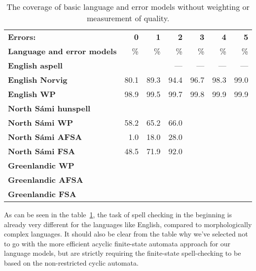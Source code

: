 \documentclass[a4paper,12pt]{article}
\begin{document}
\begin{table}
    \centering
    \begin{tabular}{|l|r|r|r||r|r|r|}
        \hline
        \bf Errors: & \bf 0  & \bf 1 & \bf 2 & \bf 3 & \bf 4 & \bf 5 \\
        \bf Language and error models &  \% & \% & \% & \% & \% & \% \\
        \hline
        \bf English aspell &      &      & ---  & ---  & ---  & ---  \\
        \bf English Norvig & 80.1 & 89.3 & 94.4 & 96.7 & 98.3 & 99.0 \\
            \bf English WP & 98.9 & 99.5 & 99.7 & 99.8 & 99.9 & 99.9 \\
        \hline
        \bf North Sámi hunspell & & & & & & \\
        \bf North Sámi WP & 58.2 & 65.2 & 66.0 & & & \\
               \bf North Sámi AFSA & 1.0 & 18.0 & 28.0 & & & \\
               \bf North Sámi FSA & 48.5 & 71.9 & 92.0 & & & \\
        \hline
        \bf Greenlandic WP & & & & & & \\
                 \bf Greenlandic AFSA & & & & & & \\
                  \bf Greenlandic FSA & & & & & & \\
        \hline
    \end{tabular}
    \caption{The coverage of basic language and error models without weighting
        or measurement of quality.\label{table:baseline-coverage}}
\end{table}

As can be seen in the table~\ref{table:baseline-coverage}, the task of spell
checking in the beginning is already very different for the languages like
English, compared to morphologically complex languages. It should also
be clear from the table why we've selected not to go with the more efficient
acyclic finite-state automata approach for our language models, but are
strictly requiring the finite-state spell-checking to be based on the
non-restricted cyclic automata.
\end{document}
